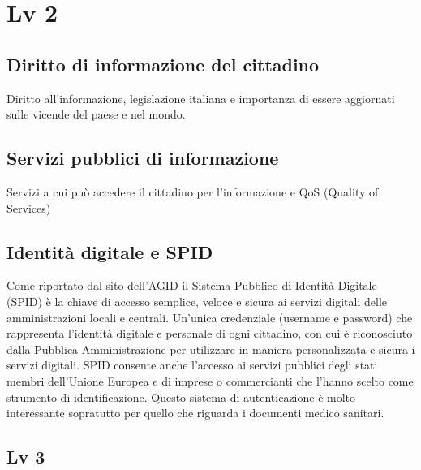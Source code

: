\documentclass{article}
\begin{document}
\section{Lv 2}
\subsection{Diritto di informazione del cittadino}
Diritto all'informazione, legislazione italiana e importanza di essere aggiornati sulle vicende del paese e nel mondo.
\subsection{Servizi pubblici di informazione}
Servizi a cui può accedere il cittadino per l'informazione e QoS (Quality of Services)
\subsection{Identità digitale e SPID}
Come riportato dal sito dell'AGID \cite{Agid-2015} il Sistema Pubblico di Identità Digitale (SPID) è la chiave di accesso semplice, veloce e sicura ai servizi digitali delle amministrazioni locali e centrali. 
Un’unica credenziale (username e password) che rappresenta l’identità digitale e personale di ogni cittadino, con cui è riconosciuto dalla Pubblica Amministrazione per utilizzare in maniera personalizzata e sicura i servizi digitali. 
SPID consente anche l’accesso ai servizi pubblici degli stati membri dell’Unione Europea e di imprese o commercianti che l’hanno scelto come strumento di identificazione.
Questo sistema di autenticazione è molto interessante sopratutto per quello che riguarda i documenti medico sanitari.
\subsection{Lv 3}
\end{document}
